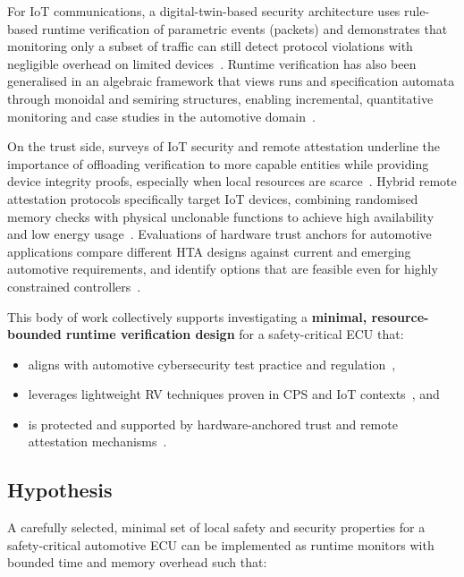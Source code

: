 For IoT communications, a digital-twin-based security architecture uses rule-based runtime verification of parametric events (packets) and demonstrates that monitoring only a subset of traffic can still detect protocol violations with negligible overhead on limited devices~\cite{dehoz2022iotdt}. Runtime verification has also been generalised in an algebraic framework that views runs and specification automata through monoidal and semiring structures, enabling incremental, quantitative monitoring and case studies in the automotive domain~\cite{jaksic2018algebraic}.

On the trust side, surveys of IoT security and remote attestation underline the importance of offloading verification to more capable entities while providing device integrity proofs, especially when local resources are scarce~\cite{williams2022survey,saadat2024rosmonitoring2}. Hybrid remote attestation protocols specifically target IoT devices, combining randomised memory checks with physical unclonable functions to achieve high availability and low energy usage~\cite{plappert2023hta}. Evaluations of hardware trust anchors for automotive applications compare different HTA designs against current and emerging automotive requirements, and identify options that are feasible even for highly constrained controllers~\cite{plappert2023hta}.

This body of work collectively supports investigating a \textbf{minimal, resource-bounded runtime verification design} for a safety-critical ECU that:
\begin{itemize}
  \item aligns with automotive cybersecurity test practice and regulation~\cite{ekert2021cybersecurity},
  \item leverages lightweight RV techniques proven in CPS and IoT contexts~\cite{krichen2023survey,zhang2024context,dehoz2022iotdt}, and
  \item is protected and supported by hardware-anchored trust and remote attestation mechanisms~\cite{saadat2024rosmonitoring2,plappert2023hta}.
\end{itemize}

\subsection{Hypothesis}

A carefully selected, minimal set of local safety and security properties for a safety-critical automotive ECU can be implemented as runtime monitors with bounded time and memory overhead such that:


